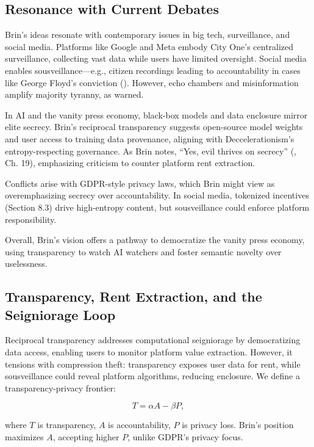 \documentclass[12pt]{article}
\begin{document}
\subsection{Resonance with Current Debates}

Brin's ideas resonate with contemporary issues in big tech, surveillance, and social media. Platforms like Google and Meta embody City One's centralized surveillance, collecting vast data while users have limited oversight. Social media enables sousveillance—e.g., citizen recordings leading to accountability in cases like George Floyd's conviction (\citealp{post36}). However, echo chambers and misinformation amplify majority tyranny, as warned.

In AI and the vanity press economy, black-box models and data enclosure mirror elite secrecy. Brin's reciprocal transparency suggests open-source model weights and user access to training data provenance, aligning with Deccelerationism's entropy-respecting governance. As Brin notes, ``Yes, evil thrives on secrecy'' (\citealp{Brin1998}, Ch. 19), emphasizing criticism to counter platform rent extraction.

Conflicts arise with GDPR-style privacy laws, which Brin might view as overemphasizing secrecy over accountability. In social media, tokenized incentives (Section 8.3) drive high-entropy content, but sousveillance could enforce platform responsibility.

Overall, Brin's vision offers a pathway to democratize the vanity press economy, using transparency to watch AI watchers and foster semantic novelty over uselessness.

\subsection{Transparency, Rent Extraction, and the Seigniorage Loop}

Reciprocal transparency addresses computational seigniorage by democratizing data access, enabling users to monitor platform value extraction. However, it tensions with compression theft: transparency exposes user data for rent, while sousveillance could reveal platform algorithms, reducing enclosure. We define a transparency-privacy frontier:

\[
T = \alpha A - \beta P,
\]

where \( T \) is transparency, \( A \) is accountability, \( P \) is privacy loss. Brin's position maximizes \( A \), accepting higher \( P \), unlike GDPR's privacy focus.
\end{document}
